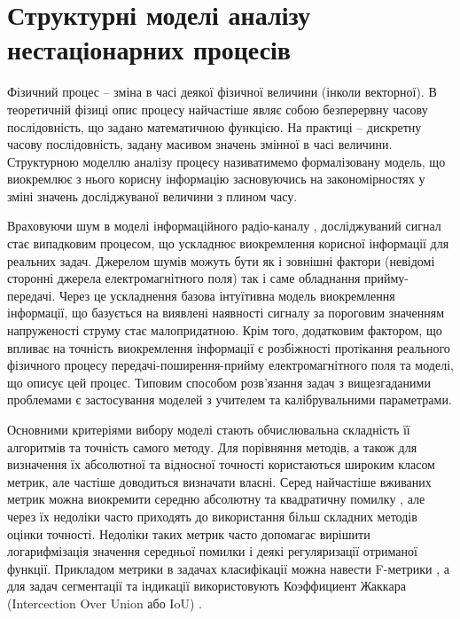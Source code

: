 \section{Структурні моделі аналізу нестаціонарних процесів}

Фізичний процес -- зміна в часі деякої фізичної величини (інколи векторної). 
В теоретичній фізиці опис процесу найчастіше являє собою безперервну часову 
послідовність, що задано математичною функцією. На практиці -- дискретну часову 
послідовність, задану масивом значень змінної в часі величини. Структурною 
моделлю аналізу процесу називатимемо формалізовану модель, що виокремлює 
з нього корисну інформацію засновуючись на закономірностях у зміні значень 
досліджуваної величини з плином часу.

Враховуючи шум в моделі інформаційного радіо-каналу \cite{imp:Shihovcev2011}, 
досліджуваний сигнал стає випадковим процесом, що ускладнює виокремлення 
корисної інформації для реальних задач. Джерелом шумів можуть бути як і 
зовнішні фактори (невідомі сторонні джерела електромагнітного поля) так і
саме обладнання прийму-передачі. Через це ускладнення базова інтуїтивна модель
виокремлення інформації, що базується на виявлені наявності сигналу за 
пороговим значенням напруженості струму стає малопридатною. Крім того,
додатковим фактором, що впливає на точність виокремлення інформації є розбіжності
протікання реального фізичного процесу передачі-поширення-прийму 
електромагнітного поля та моделі, що описує цей процес. Типовим способом 
розв'язання задач з вищезгаданими проблемами є застосування моделей з учителем
та калібрувальними параметрами.


Основними критеріями вибору моделі стають обчислювальна складність її алгоритмів 
та точність самого методу. Для порівняння методів, а також для визначення їх 
абсолютної та відносної точності користаються широким класом метрик, але 
частіше доводиться визначати власні. Серед найчастіше вживаних метрик можна 
виокремити середню абсолютну та квадратичну помилку \cite{imp:Willmott2005}, 
але через їх недоліки часто приходять до використання більш складних методів 
оцінки точності. Недоліки таких метрик часто допомагає вирішити логарифмізація 
значення середньої помилки і деякі регуляризації отриманої функції. 
Прикладом метрики в задачах класифікації можна навести F-метрики 
\cite{imp:Tharwat2018}, а для задач сегментації та індикації використовують 
Коэффициент Жаккара (Intercection Over Union або IoU) \cite{imp:Jaccard1901}.

